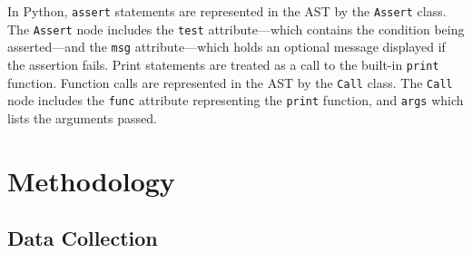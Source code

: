 In Python, \lstinline{assert} statements are represented in the AST by the \lstinline{Assert} class. The \lstinline{Assert} node includes the \lstinline{test} attribute---which contains the condition being asserted---and the \lstinline{msg} attribute---which holds an optional message displayed if the assertion fails. Print statements are treated as a call to the built-in \lstinline{print} function. Function calls are represented in the AST by the \lstinline{Call} class. The \lstinline{Call} node includes the \lstinline{func} attribute representing the \lstinline{print} function, and \lstinline{args} which lists the arguments passed.

\section{Methodology}

\subsection{Data Collection}\label{sec:data-collect}



